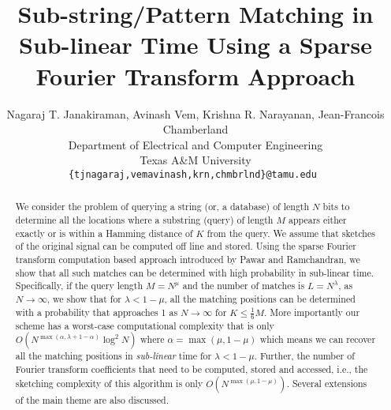 \documentclass[sigconf]{acmart}
\begin{document}
\title[Sub-string Matching in Sub-linear Time]{Sub-string/Pattern Matching in Sub-linear Time Using a Sparse Fourier Transform Approach}

\author{Nagaraj T. Janakiraman, Avinash Vem, Krishna R. Narayanan, Jean-Francois Chamberland\\
Department of Electrical and Computer Engineering \\
Texas A\&M University\\
{\tt\small {\{tjnagaraj,vemavinash,krn,chmbrlnd\}@tamu.edu} }}

%
%
\renewcommand{\shortauthors}{Janakiraman et al.}

\begin{abstract}
	We consider the problem of querying a string (or, a database) of length $N$ bits to determine all the locations where a substring (query) of length $M$ appears either exactly or is within a Hamming distance of $K$ from the query. We assume that sketches of the original signal can be computed off line and stored. Using the sparse Fourier transform computation based approach introduced by Pawar and Ramchandran, we show that all such matches can be determined with high probability in sub-linear time. Specifically, if the query length $M = N^\mu$ and the number of matches is $L=N^\lambda$, as $N\rightarrow \infty$, we show that  for $\lambda < 1-\mu$, all the matching positions can be determined with a probability that approaches 1 as $N \rightarrow \infty$ for $K \leq \frac{1}{6}M$. More importantly our scheme has a worst-case computational complexity that is only $O\left(N^{\max(\alpha,\lambda+1-\alpha)} \log^2 N \right)$ where $\alpha=\max(\mu,1-\mu)$ which means we can recover all the matching positions in {\it sub-linear} time for $\lambda<1-\mu$. Further, the number of Fourier transform coefficients that need to be computed, stored and accessed, i.e., the sketching complexity of this algorithm is only $O\left( N^{\max(\mu,1-\mu)}\right)$. Several extensions of the main theme are also discussed.
\end{abstract}
\end{document}
